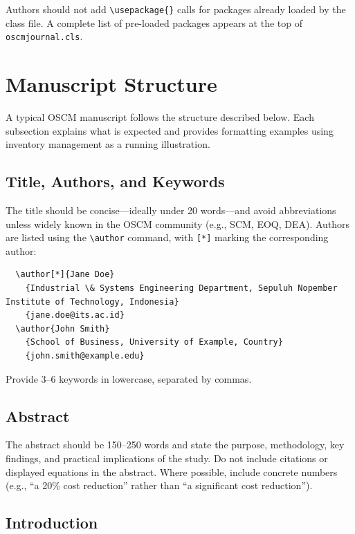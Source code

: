 \documentclass[preprint]{oscmjournal}
\begin{document}
Authors should not add \verb|\usepackage{}| calls for packages already loaded by the class file.
A complete list of pre-loaded packages appears at the top of \texttt{oscmjournal.cls}.


\section{Manuscript Structure}\label{sec:structure}

A typical OSCM manuscript follows the structure described below.
Each subsection explains what is expected and provides formatting examples using inventory management as a running illustration.

\subsection{Title, Authors, and Keywords}

The title should be concise---ideally under 20 words---and avoid abbreviations unless widely known in the OSCM community (e.g., SCM, EOQ, DEA).
Authors are listed using the \verb|\author| command, with \verb|[*]| marking the corresponding author:

\begin{verbatim}
  \author[*]{Jane Doe}
    {Industrial \& Systems Engineering Department, Sepuluh Nopember Institute of Technology, Indonesia}
    {jane.doe@its.ac.id}
  \author{John Smith}
    {School of Business, University of Example, Country}
    {john.smith@example.edu}
\end{verbatim}

Provide 3--6 keywords in lowercase, separated by commas.

\subsection{Abstract}

The abstract should be 150--250 words and state the purpose, methodology, key findings, and practical implications of the study.
Do not include citations or displayed equations in the abstract.
Where possible, include concrete numbers (e.g., ``a 20\% cost reduction'' rather than ``a significant cost reduction'').

\subsection{Introduction}
\end{document}
